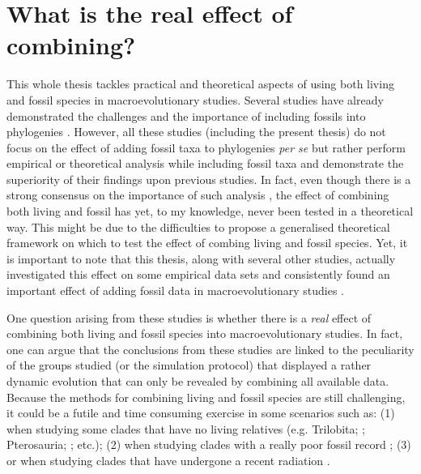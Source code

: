 \section{What is the real effect of combining?}
This whole thesis tackles practical and theoretical aspects of using both living and fossil species in macroevolutionary studies.
Several studies have already demonstrated the challenges and the importance of including fossils into phylogenies \citep[e.g.][]{ronquista2012,slaterphylogenetic2013,Wood01032013,beckancient2014,Dembo2015}.
However, all these studies (including the present thesis) do not focus on the effect of adding fossil taxa to phylogenies \textit{per se} but rather perform empirical or theoretical analysis while including fossil taxa and demonstrate the superiority of their findings upon previous studies.
In fact, even though there is a strong consensus on the importance of such analysis \citep{jacksonwhat2006,quentaldiversity2010,dietlconservation2011,slaterunifying2013,fritzdiversity2013,benton2015}, the effect of combining both living and fossil has yet, to my knowledge, never been tested in a theoretical way.
This might be due to the difficulties to propose a generalised theoretical framework on which to test the effect of combing living and fossil species.
Yet, it is important to note that this thesis, along with several other studies, actually investigated this effect on some empirical data sets and consistently found an important effect of adding fossil data in macroevolutionary studies \citep{Finarelli2006,Slateretal2012,slaterphylogenetic2013,SlaterPennel2014,pant2014complex,Mitchell2015}.

One question arising from these studies is whether there is a \textit{real} effect of combining both living and fossil species into macroevolutionary studies.
In fact, one can argue that the conclusions from these studies are linked to the peculiarity of the groups studied (or the simulation protocol) that displayed a rather dynamic evolution that can only be revealed by combining all available data.
Because the methods for combining living and fossil species are still challenging, it could be a futile and time consuming exercise in some scenarios such as: (1) when studying some clades that have no living relatives (e.g. Trilobita; \citealt{hopkinsdecoupling2013}; Pterosauria; \citealt{Butler2012}; etc.); (2) when studying clades with a really poor fossil record \citep[e.g. Aves where there are three orders of magnitude more known living than fossil taxa;][]{jetzthe2012,Mitchell2015}; (3) or when studying clades that have undergone a recent radiation \citep[e.g. Cichlidae][]{Genner01052007}.

